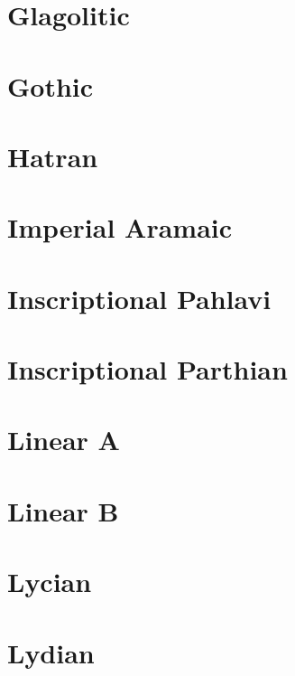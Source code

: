\section{Glagolitic}

\section{Gothic}

\section{Hatran}

\section{Imperial Aramaic}

\section{Inscriptional Pahlavi}

\section{Inscriptional Parthian}


\section{Linear A}

\section{Linear B}

\section{Lycian}

\section{Lydian}










